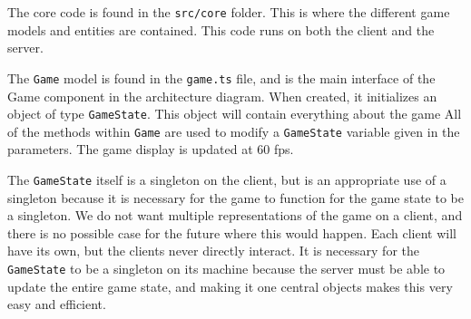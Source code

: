 \documentclass[12pt]{report}
\begin{document}
The core code is found in the \texttt{src/core} folder. This is where the different game models and entities are contained. This code runs on both the client and the server. 


The \texttt{Game} model is found in the \texttt{game.ts} file, and is the main interface of the Game component in the architecture diagram. When created, it initializes an object of type \texttt{GameState}. This object will contain everything about the game 
All of the methods within \texttt{Game} are used to modify a \texttt{GameState} variable given in the parameters. 
The game display is updated at 60 fps. 

The \texttt{GameState} itself is a singleton on the client, but is an appropriate use of a singleton because it is necessary for the game to function for the game state to be a singleton. We do not want multiple representations of the game on a client, and there is no possible case for the future where this would happen. Each client will have its own, but the clients never directly interact.
It is necessary for the \texttt{GameState} to be a singleton on its machine because the server must be able to update the entire game state, and making it one central objects makes this very easy and efficient.


\end{document}
